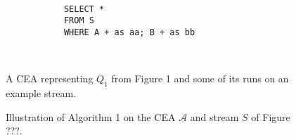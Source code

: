 \begin{figure}[H]
  \centering
  \begin{subfigure}[t]{\textwidth}
    \centering
  \end{subfigure}
  \\
  \begin{subfigure}[b]{\textwidth}
    \begin{verbatim}
      SELECT *
      FROM S
      WHERE A + as aa; B + as bb
    \end{verbatim}
  \end{subfigure}
  \\
  \begin{subfigure}[b]{\textwidth}
    \centering
  \end{subfigure}
  \caption{A CEA representing $Q_{1}$ from Figure 1 and some of its runs on an example stream.}
  \label{fig:label}
\end{figure}

\begin{figure}[H]
  \begin{subfigure}[t]{0.1\linewidth}
  \end{subfigure}
  \begin{subfigure}[t]{0.1\linewidth}
  \end{subfigure}
  \begin{subfigure}[t]{0.24\linewidth}
  \end{subfigure}
  \begin{subfigure}[t]{0.24\linewidth}
  \end{subfigure}
  \begin{subfigure}[t]{0.28\linewidth}
  \end{subfigure}
  \caption{Illustration of Algorithm 1 on the CEA $\mathcal{A}$ and stream $S$ of Figure ???.}
  \label{fig:label}
\end{figure}
